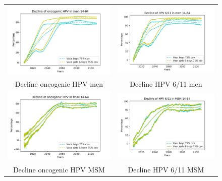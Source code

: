 \begin{figure}[!]
	\centering
	\begin{tabular}{cc}
		\includegraphics[width=0.5\linewidth]{IMGs/10.-Coste_efectividad/solo_hom_y_ambos/onco_hom.pdf}	& 
		\includegraphics[width=0.5\linewidth]{IMGs/10.-Coste_efectividad/solo_hom_y_ambos/verr_hom.pdf}  \\ 
		Decline oncogenic HPV men	& Decline HPV 6/11 men \\ 
		\includegraphics[width=0.5\linewidth]{IMGs/10.-Coste_efectividad/solo_hom_y_ambos/onco_MSM.pdf}	& 
		\includegraphics[width=0.5\linewidth]{IMGs/10.-Coste_efectividad/solo_hom_y_ambos/verr_MSM.pdf}  \\ 
		Decline oncogenic HPV MSM	& Decline HPV 6/11 MSM \\ 

\end{tabular}
\end{figure}
